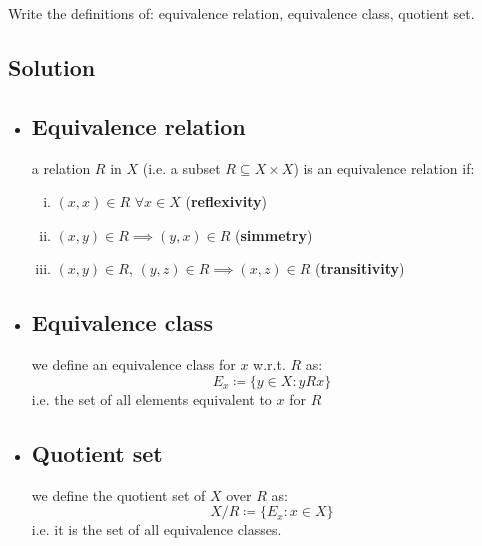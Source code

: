 
\question
Write the definitions of: equivalence relation, equivalence class, quotient set.

\subsection*{Solution}
\provdefs
\begin{itemize}
    \item \subsection{Equivalence relation} \label{equivrel} a relation $R$ in $X$ (i.e. a subset $R\subseteq X\times X$) is an equivalence relation if:
    \begin{enumerate}[i)]
        \item $(x,x) \in R$ $\forall x\in X$ (\textbf{reflexivity})
        \item $(x,y) \in R \implies (y,x)\in R$ (\textbf{simmetry})
        \item $(x,y) \in R, \, (y,z)\in R \implies (x,z)\in R$ (\textbf{transitivity})
    \end{enumerate}
    \item \subsection{Equivalence class} we define an equivalence class for $x$ w.r.t. $R$ as:
    \[
        E_x \coloneqq \{y\in X : yRx\}
    \]
    i.e. the set of all elements equivalent to $x$ for $R$
    \item \subsection{Quotient set} we define the quotient set of $X$ over $R$ as:
    \[
        X / R \coloneqq \{E_x: x\in X \}    
    \]
    i.e. it is the set of all equivalence classes.
\end{itemize}